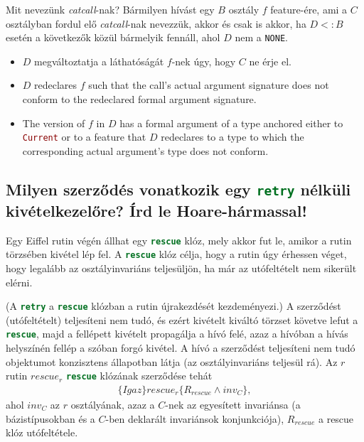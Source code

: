 	Mit nevezünk \textit{catcall}-nak? Bármilyen hívást egy $B$ osztály $f$ feature-ére, ami a $C$ osztályban fordul elő \textit{catcall}-nak nevezzük, akkor és csak is akkor, ha $D<:B$ esetén a következők közül bármelyik fennáll, ahol $D$ nem a \lstinline[language=Eiffel]|NONE|.
	\begin{itemize}
		\item $D$ megváltoztatja a láthatóságát $f$-nek úgy, hogy $C$ ne érje el.
		\item $D$ redeclares $f$ such that the call's actual argument signature does not conform to the redeclared formal argument signature.
		\item The version of $f$ in $D$ has a formal argument of a type anchored either to \lstinline[language=Eiffel]|Current| or to a feature that $D$ redeclares to a type to which the corresponding actual argument's type does not conform.
	\end{itemize}
	
	
\subsection{ Milyen szerződés vonatkozik egy \lstinline[language=Eiffel]|retry| nélküli kivételkezelőre? Írd le Hoare-hármassal! }
	Egy Eiffel rutin végén állhat egy \lstinline[language=Eiffel]|rescue| klóz, mely akkor fut le, amikor a rutin törzsében kivétel lép fel. A \lstinline[language=Eiffel]|rescue| klóz célja, hogy a rutin úgy érhessen véget, hogy legalább az osztályinvariáns teljesüljön, ha már az utófeltételt nem sikerült elérni.
	
	(A \lstinline[language=Eiffel]|retry| a \lstinline[language=Eiffel]|rescue| klózban a rutin újrakezdését kezdeményezi.) A szerződést (utófeltételt) teljesíteni nem tudó, és ezért kivételt kiváltó törzset követve lefut a \lstinline[language=Eiffel]|rescue|, majd a fellépett kivételt propagálja a hívó felé, azaz a hívóban a hívás helyszínén fellép a szóban forgó kivétel. A hívó a szerződést teljesíteni nem tudó objektumot konzisztens állapotban látja (az osztályinvariáns teljesül rá). Az $r$ rutin $rescue_r$ \lstinline[language=Eiffel]|rescue| klózának szerződése tehát
	\begin{align*}
	\{Igaz\} rescue_r \{R_{rescue}\wedge inv_C\},
	\end{align*}
	ahol $inv_C$ az $r$ osztályának, azaz a $C$-nek az egyesített invariánsa (a bázistípusokban és a $C$-ben deklarált invariánsok konjunkciója), $R_{rescue}$ a rescue klóz utófeltétele.
	
